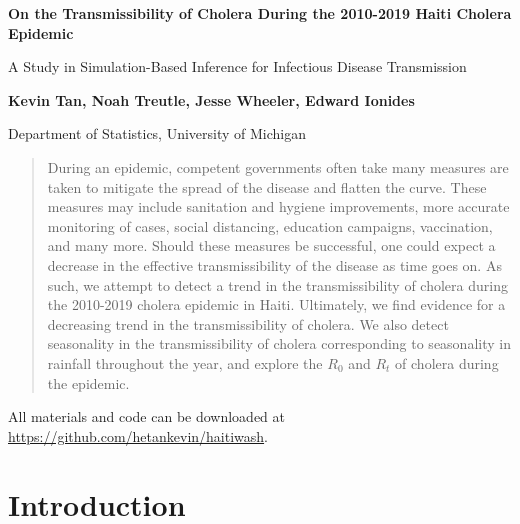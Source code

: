 \documentclass[12pt]{article}
\date{This manuscript was compiled on \today}
\begin{document}


\def\spacingset#1{\renewcommand{\baselinestretch}%
{#1}\small\normalsize} \spacingset{1}

\thispagestyle{plain}
\begin{center}
    \Large
    \textbf{On the Transmissibility of Cholera During the 2010-2019 Haiti Cholera Epidemic}
        
    \vspace{0.1cm}
    \large
    A Study in Simulation-Based Inference for Infectious Disease Transmission
        
    \vspace{0.4cm}
    \textbf{Kevin Tan, Noah Treutle, Jesse Wheeler, Edward Ionides}
    
    \vspace{0.2cm}
    Department of Statistics, University of Michigan
       
    \vspace{0.9cm}
\end{center}

\begin{abstract}
During an epidemic, competent governments often take many measures are taken to mitigate the spread of the disease and flatten the curve. These measures may include sanitation and hygiene improvements, more accurate monitoring of cases, social distancing, education campaigns, vaccination, and many more. Should these measures be successful, one could expect a decrease in the effective transmissibility of the disease as time goes on. As such, we attempt to detect a trend in the transmissibility of cholera during the 2010-2019 cholera epidemic in Haiti. Ultimately, we find evidence for a decreasing trend in the transmissibility of cholera. We also detect seasonality in the transmissibility of cholera corresponding to seasonality in rainfall throughout the year, and explore the $R_0$ and $R_t$ of cholera during the epidemic. 
\end{abstract}

\vfill

\noindent All materials and code can be downloaded at \url{https://github.com/hetankevin/haitiwash}.

\newpage

\spacingset{1.25} %

\section{Introduction}
\end{document}
